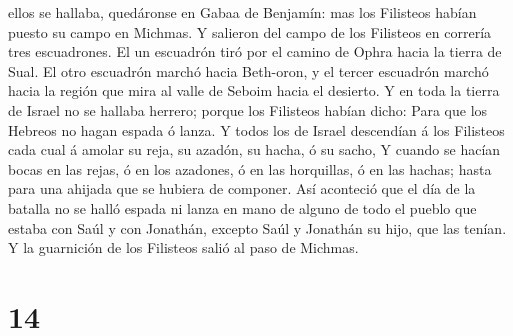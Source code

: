 ellos se hallaba, quedáronse en Gabaa de Benjamín: mas los Filisteos
habían puesto su campo en Michmas.  Y salieron del campo de
los Filisteos en correría tres escuadrones. El un escuadrón tiró por el
camino de Ophra hacia la tierra de Sual.  El otro escuadrón
marchó hacia Beth-oron, y el tercer escuadrón marchó hacia la región que
mira al valle de Seboim hacia el desierto.  Y en toda la
tierra de Israel no se hallaba herrero; porque los Filisteos habían
dicho: Para que los Hebreos no hagan espada ó lanza.  Y
todos los de Israel descendían á los Filisteos cada cual á amolar su
reja, su azadón, su hacha, ó su sacho,  Y cuando se hacían
bocas en las rejas, ó en los azadones, ó en las horquillas, ó en las
hachas; hasta para una ahijada que se hubiera de componer. 
Así aconteció que el día de la batalla no se halló espada ni lanza en
mano de alguno de todo el pueblo que estaba con Saúl y con Jonathán,
excepto Saúl y Jonathán su hijo, que las tenían.  Y la
guarnición de los Filisteos salió al paso de Michmas.

\hypertarget{section-13}{%
\section{14}\label{section-13}}

